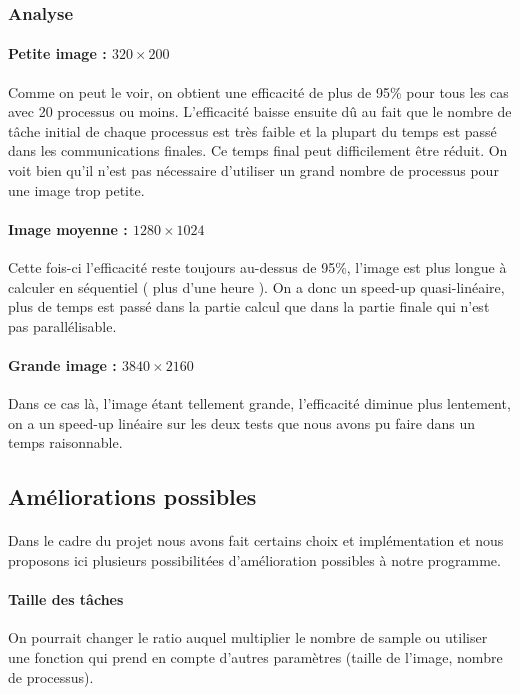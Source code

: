 \documentclass{article}
\begin{document}
\subsubsection{Analyse}

\paragraph{Petite image : $320 \times 200$}
Comme on peut le voir, on obtient une efficacit\'e de plus de 95\% pour tous les cas avec 20 processus ou moins. 
L'efficacit\'e baisse ensuite d\^u au fait que le nombre de t\^ache initial de chaque processus est tr\`es faible et 
la plupart du temps est pass\'e dans les communications finales.
Ce temps final peut difficilement \^etre r\'eduit. 
On voit bien qu'il n'est pas n\'ecessaire d'utiliser un grand nombre de processus pour une image trop petite.

\paragraph{Image moyenne : $1280 \times 1024$}
Cette fois-ci l'efficacit\'e reste toujours au-dessus de 95\%, l'image est plus longue \`a calculer en s\'equentiel ( plus d'une heure ). On a donc un speed-up quasi-lin\'eaire,
plus de temps est pass\'e dans la partie calcul que dans la partie finale qui n'est pas parall\'elisable.

\paragraph{Grande image : $3840 \times 2160$}
Dans ce cas l\`a, l'image \'etant tellement grande, l'efficacit\'e diminue plus lentement, on a un speed-up lin\'eaire sur les deux tests que nous avons pu faire dans un temps raisonnable.

\subsection{Am\'eliorations possibles}

\paragraph{}
Dans le cadre du projet nous avons fait certains choix et impl\'ementation et nous proposons ici plusieurs possibilit\'ees d'am\'elioration possibles \`a notre programme.

\paragraph{Taille des t\^aches}
On pourrait changer le ratio auquel multiplier le nombre de sample ou utiliser une fonction qui prend en compte d'autres param\`etres (taille de l'image, nombre de processus).
\end{document}
